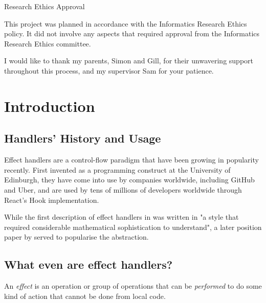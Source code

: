 \documentclass[logo,bsc,singlespacing,parskip,online]{infthesis}
\begin{document}
\begin{preliminary}
\newenvironment{ethics}
   {\begin{frontenv}{Research Ethics Approval}{\LARGE}}
   {\end{frontenv}\newpage}

\begin{ethics}

This project was planned in accordance with the Informatics Research
Ethics policy. It did not involve any aspects that required approval
from the Informatics Research Ethics committee.

\standarddeclaration
\end{ethics}


\begin{acknowledgements}
I would like to thank my parents, Simon and Gill, for their unwavering support throughout this process, and my supervisor Sam for your patience. 
\end{acknowledgements}


\tableofcontents
\end{preliminary}


\chapter{Introduction}

\section{Handlers' History and Usage}
Effect handlers are a control-flow paradigm that have been growing in popularity recently. \citep{effekt-paper} First invented as a programming construct at the University of Edinburgh, they have come into use by companies worldwide, including GitHub and Uber, and are used by tens of millions of developers worldwide through React's Hook implementation. \citep{impact_study}

While the first description of effect handlers in \citet{og-paper} was written in "a style that required
considerable mathematical sophistication to understand", \citep{impact_study} a later position paper by \citeauthor{action-position-paper} served to popularise the abstraction.

\section{What even are effect handlers?}
An \textit{effect} is an operation or group of operations that can be \textit{performed} to do some kind of action that cannot be done from local code. 
\end{document}
